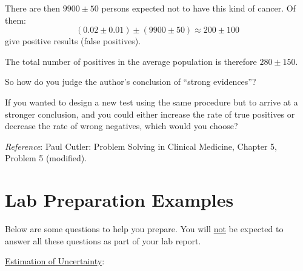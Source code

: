 \documentclass{article}
\begin{document}
There are then $9900 \pm 50$ persons expected not to have this kind of cancer. Of them:
\begin{equation}
    (0.02 \pm 0.01)\pm(9900 \pm 50) \approx 200 \pm 100
\end{equation}
give positive results (false positives).\myskip

The total number of positives in the average population is therefore $280 \pm 150$.\myskip

So how do you judge the author's conclusion of ``strong evidences''?\myskip

If you wanted to design a new test using the same procedure but to arrive at a stronger conclusion, and you could either increase the rate of true positives or decrease the rate of wrong negatives, which would you choose?\myskip

\noindent\emph{Reference}: Paul Cutler: Problem Solving in Clinical Medicine, Chapter 5, Problem 5 (modified).

\section{Lab Preparation Examples}

Below are some questions to help you prepare. You will \underline{not} be expected to answer all these questions as part of your lab report. \myskip

\noindent \underline{Estimation of Uncertainty}:\myskip
\end{document}
